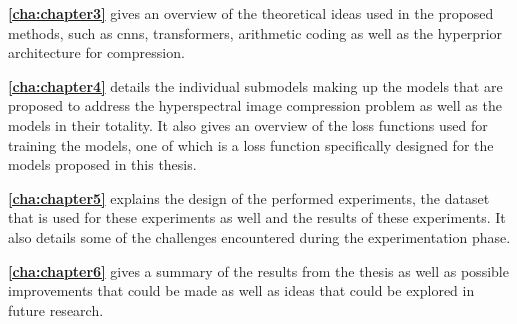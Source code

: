 \textbf{\autoref{cha:chapter3}} gives an overview of the theoretical ideas used in the proposed methods, such as \acp{cnn}, transformers, arithmetic coding as well as the hyperprior architecture for compression.

\textbf{\autoref{cha:chapter4}} details the individual submodels making up the models that are proposed to address the hyperspectral image compression problem as well as the models in their totality. It also gives an overview of the loss functions used for training the models, one of which is a loss function specifically designed for the models proposed in this thesis.

\textbf{\autoref{cha:chapter5}} explains the design of the performed experiments, the dataset that is used for these experiments as well and the results of these experiments. It also details some of the challenges encountered during the experimentation phase.

\textbf{\autoref{cha:chapter6}} gives a summary of the results from the thesis as well as possible improvements that could be made as well as ideas that could be explored in future research.
